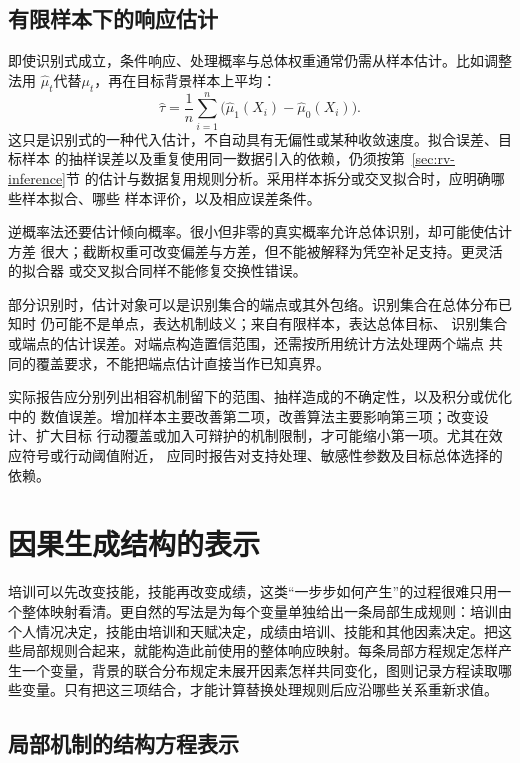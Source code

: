 \subsection{有限样本下的响应估计}
\label{sec:causal-response-estimation}

即使识别式成立，条件响应、处理概率与总体权重通常仍需从样本估计。比如调整法用
\(\widehat\mu_t\)代替\(\mu_t\)，再在目标背景样本上平均：
\[
  \widehat\tau
  =\frac1n\sum_{i=1}^n
    \bigl(\widehat\mu_1(X_i)-\widehat\mu_0(X_i)\bigr).
\]
这只是识别式的一种代入估计，不自动具有无偏性或某种收敛速度。拟合误差、目标样本
的抽样误差以及重复使用同一数据引入的依赖，仍须按第~\ref{sec:rv-inference}节
的估计与数据复用规则分析。采用样本拆分或交叉拟合时，应明确哪些样本拟合、哪些
样本评价，以及相应误差条件。

逆概率法还要估计倾向概率。很小但非零的真实概率允许总体识别，却可能使估计方差
很大；截断权重可改变偏差与方差，但不能被解释为凭空补足支持。更灵活的拟合器
或交叉拟合同样不能修复交换性错误。

部分识别时，估计对象可以是识别集合的端点或其外包络。识别集合在总体分布已知时
仍可能不是单点，表达机制歧义；来自有限样本，表达总体目标、
识别集合或端点的估计误差。对端点构造置信范围，还需按所用统计方法处理两个端点
共同的覆盖要求，不能把端点估计直接当作已知真界。

实际报告应分别列出相容机制留下的范围、抽样造成的不确定性，以及积分或优化中的
数值误差。增加样本主要改善第二项，改善算法主要影响第三项；改变设计、扩大目标
行动覆盖或加入可辩护的机制限制，才可能缩小第一项。尤其在效应符号或行动阈值附近，
应同时报告对支持处理、敏感性参数及目标总体选择的依赖。

\section{因果生成结构的表示}
\label{sec:causal-generating-structure}

培训可以先改变技能，技能再改变成绩，这类“一步步如何产生”的过程很难只用一个整体映射看清。更自然的写法是为每个变量单独给出一条局部生成规则：培训由个人情况决定，技能由培训和天赋决定，成绩由培训、技能和其他因素决定。把这些局部规则合起来，就能构造此前使用的整体响应映射。每条局部方程规定怎样产生一个变量，背景的联合分布规定未展开因素怎样共同变化，图则记录方程读取哪些变量。只有把这三项结合，才能计算替换处理规则后应沿哪些关系重新求值。

\subsection{局部机制的结构方程表示}
\label{sec:causal-local-structural-equations}

